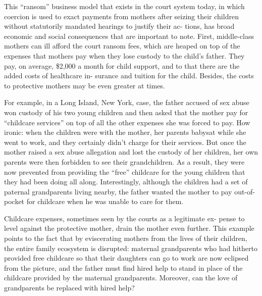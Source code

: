 

This “ransom” business model that exists in the court system today, in
which coercion is used to exact payments from mothers after seizing
their children without statutorily mandated hearings to justify their ac-
tions, has broad economic and social consequences that are important
to note. First, middle-class mothers can ill afford the court ransom fees,
which are heaped on top of the expenses that mothers pay when they
lose custody to the child’s father. They pay, on average, \$2,000 a month
for child support, and to that there are the added costs of healthcare in-
surance and tuition for the child. Besides, the costs to protective mothers
may be even greater at times. \pfl{}


For example, in a Long Island, New York, case, the father accused of
sex abuse won custody of his two young children and then asked that
the mother pay for “childcare services” on top of all the other expenses
she was forced to pay. How ironic: when the children were with the
mother, her parents babysat while she went to work, and they certainly
didn’t charge for their services. But once the mother raised a sex abuse
allegation and lost the custody of her children, her own parents were
then forbidden to see their grandchildren. As a result, they were now
prevented from providing the “free” childcare for the young children
that they had been doing all along. Interestingly, although the children
had a set of paternal grandparents living nearby, the father wanted the
mother to pay out-of-pocket for childcare when he was unable to care for
them. \pfl{}


Childcare expenses, sometimes seen by the courts as a legitimate ex-
pense to level against the protective mother, drain the mother even
further. This example points to the fact that by eviscerating mothers
from the lives of their children, the entire family ecosystem is disrupted:
maternal grandparents who had hitherto provided free childcare so that
their daughters can go to work are now eclipsed from the picture, and
the father must find hired help to stand in place of the childcare provided
by the maternal grandparents. Moreover, can the love of grandparents
be replaced with hired help? \pfl{}


